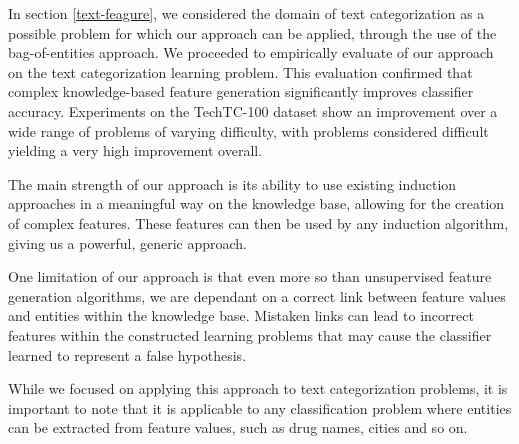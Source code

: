\documentclass[twoside,11pt]{article}
\theoremstyle{definition}
\begin{document}
In section \ref{text-feagure}, we considered the domain of text categorization as a possible problem for which our approach can be applied, through the use of the bag-of-entities approach. We proceeded to empirically evaluate of our approach on the text categorization learning problem.
This evaluation confirmed that complex knowledge-based feature generation significantly improves classifier accuracy. Experiments on the TechTC-100 dataset show an improvement over a wide range of problems of varying difficulty, with problems considered difficult yielding a very high improvement overall.

The main strength of our approach is its ability to use existing induction approaches in a meaningful way on the knowledge base, allowing for the creation of complex features. These features can then be used by any induction algorithm, giving us a powerful, generic approach.

One limitation of our approach is that even more so than unsupervised feature generation algorithms,  we are dependant on a correct link between feature values and entities within the knowledge base. Mistaken links can lead to incorrect features within the constructed learning problems that may cause the classifier learned to represent a false hypothesis. 

While we focused on applying this approach to text categorization problems, it is important to note that it is applicable to any classification problem where entities can be extracted from feature values, such as drug names, cities and so on. 

\clearpage
\vskip 0.2in


\end{document}
